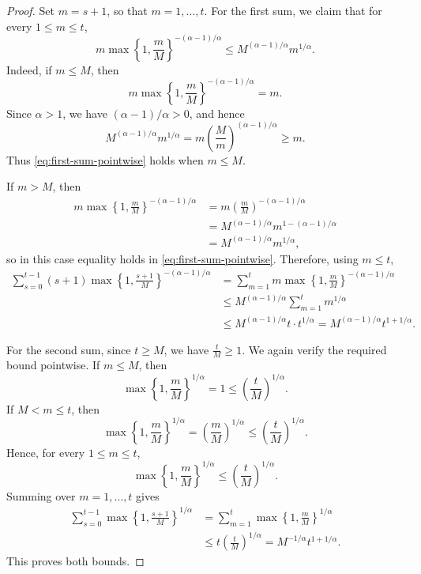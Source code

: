 \documentclass[11pt]{article}
\theoremstyle{definition}
\begin{document}
\begin{proof}
Set $m=s+1$, so that $m=1,\ldots,t$. For the first sum, we claim that for every $1\le m\le t$,
\begin{equation}
m\max\left\{1,\frac{m}{M}\right\}^{-(\alpha-1)/\alpha}
\le
M^{(\alpha-1)/\alpha}m^{1/\alpha}.
\label{eq:first-sum-pointwise}
\end{equation}
Indeed, if $m\le M$, then
\[
m\max\left\{1,\frac{m}{M}\right\}^{-(\alpha-1)/\alpha}
=
m.
\]
Since $\alpha>1$, we have $(\alpha-1)/\alpha>0$, and hence
\[
M^{(\alpha-1)/\alpha}m^{1/\alpha}
=
m\left(\frac{M}{m}\right)^{(\alpha-1)/\alpha}
\ge m.
\]
Thus \eqref{eq:first-sum-pointwise} holds when $m\le M$.

If $m>M$, then
\begin{align*}
m\max\left\{1,\frac{m}{M}\right\}^{-(\alpha-1)/\alpha}
&=
m\left(\frac{m}{M}\right)^{-(\alpha-1)/\alpha}\\
&=
M^{(\alpha-1)/\alpha}
m^{1-(\alpha-1)/\alpha}\\
&=
M^{(\alpha-1)/\alpha}m^{1/\alpha},
\end{align*}
so in this case equality holds in \eqref{eq:first-sum-pointwise}.
Therefore, using $m\le t$,
\begin{align*}
\sum_{s=0}^{t-1}
(s+1)
\max\left\{1,\frac{s+1}{M}\right\}^{-(\alpha-1)/\alpha}
&=
\sum_{m=1}^{t}
m\max\left\{1,\frac{m}{M}\right\}^{-(\alpha-1)/\alpha}\\
&\le
M^{(\alpha-1)/\alpha}
\sum_{m=1}^{t}m^{1/\alpha}\\
&\le
M^{(\alpha-1)/\alpha}
t \cdot t^{1/\alpha}=
M^{(\alpha-1)/\alpha}t^{1+1/\alpha}.
\end{align*}

For the second sum, since $t\ge M$, we have $\frac{t}{M}\ge1.$ We again verify the required bound pointwise.  If $m\le M$, then
\[
\max\left\{1,\frac{m}{M}\right\}^{1/\alpha}
=
1
\le
\left(\frac{t}{M}\right)^{1/\alpha}.
\]
If $M<m\le t$, then
\[
\max\left\{1,\frac{m}{M}\right\}^{1/\alpha}
=
\left(\frac{m}{M}\right)^{1/\alpha}
\le
\left(\frac{t}{M}\right)^{1/\alpha}.
\]
Hence, for every $1\le m\le t$,
\[
\max\left\{1,\frac{m}{M}\right\}^{1/\alpha}
\le
\left(\frac{t}{M}\right)^{1/\alpha}.
\]
Summing over $m=1,\ldots,t$ gives
\begin{align*}
\sum_{s=0}^{t-1}
\max\left\{1,\frac{s+1}{M}\right\}^{1/\alpha}
&=
\sum_{m=1}^{t}
\max\left\{1,\frac{m}{M}\right\}^{1/\alpha}\\
&\le
t\left(\frac{t}{M}\right)^{1/\alpha}= M^{-1/\alpha}t^{1+1/\alpha}.
\end{align*}
This proves both bounds.
\end{proof}
\end{document}
